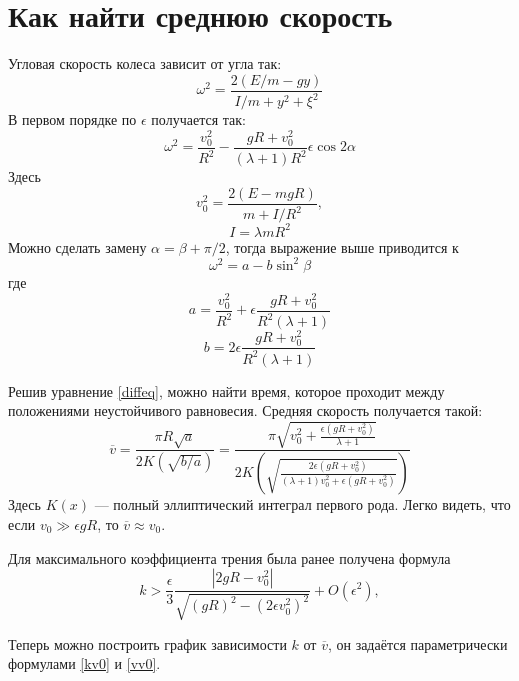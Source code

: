 \documentclass{article}
\begin{document}
	\section{Как найти среднюю скорость}
	Угловая скорость колеса зависит от угла так:
	\begin{equation}
		\omega^2 = \frac{2(E/m - gy)}{I/m + y^2 + \xi^2}
	\end{equation}
	В первом порядке по $\epsilon$ получается так:
	\begin{equation}
		\omega^2 = \frac{v_0^2}{R^2} - \frac{gR + v_0^2}{(\lambda + 1)R^2}
			\epsilon\cos{2\alpha}
	\end{equation}
	Здесь
	\begin{equation}
		v_0^2 = \frac{2(E - mgR)}{m + I/R^2},	
	\end{equation}	
	\begin{equation}
		I = \lambda mR^2
	\end{equation}
	Можно сделать замену $\alpha = \beta + \pi/2$, тогда выражение выше приводится к 
	\begin{equation}
		\label{diffeq}
		\omega^2 = a - b\sin^2{\beta}
	\end{equation}
	где
	\begin{equation}
		a = \frac{v_0^2}{R^2} + \epsilon \frac{gR + v_0^2}{R^2(\lambda + 1)}
	\end{equation}
	\begin{equation}
		b = 2\epsilon\frac{gR + v_0^2}{R^2(\lambda + 1)}
	\end{equation}

	Решив уравнение \ref{diffeq}, можно найти время, которое проходит между положениями неустойчивого
	равновесия.
	Средняя скорость получается такой:
	\begin{equation}
		\label{vv0}
		\overline{v}  =	\frac{\pi R \sqrt{a}}{2K(\sqrt{b/a})} 
		= \frac{\pi\sqrt{v_0^2 + {\displaystyle \frac{\epsilon(gR + v_0^2)}{\lambda + 1}}}}
				{2 K\!\left(\sqrt{
				{\displaystyle \frac{2\epsilon(gR + v_0^2)}{(\lambda + 1) v_0^2 + 
												\epsilon(gR + v_0^2)}}
				}\right)}
	\end{equation}
	Здесь $K(x)$ --- полный эллиптический интеграл первого рода.
	Легко видеть, что если $v_0 \gg \epsilon gR$, то $\overline{v} \approx v_0$.

	Для максимального коэффициента трения была ранее получена формула
	\begin{equation}
		\label{kv0}
		k > \frac{\epsilon}{3} 
			\frac{|2gR - v_0^2|}{\sqrt{(gR)^2 - (2\epsilon v_0^2)^2}} + O(\epsilon^2),
	\end{equation}

	Теперь можно построить график зависимости $k$ от $\overline{v}$, он задаётся параметрически
	формулами \ref{kv0} и \ref{vv0}.
\end{document}

